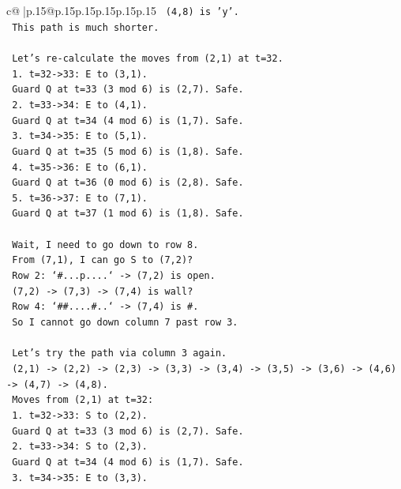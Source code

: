 \documentclass{article}
\begin{document}
{\begin{supertabular}{c@{$\;$}|p{.15\linewidth}@{}p{.15\linewidth}p{.15\linewidth}p{.15\linewidth}p{.15\linewidth}p{.15\linewidth}}
{{{\texttt{   (4,8) is 'y'.} \\
\texttt{   This path is much shorter.} \\
\\ 
\texttt{   Let's re{-}calculate the moves from (2,1) at t=32.} \\
\texttt{   1. t=32{-}>33: E to (3,1).} \\
\texttt{      Guard Q at t=33 (3 mod 6) is (2,7). Safe.} \\
\texttt{   2. t=33{-}>34: E to (4,1).} \\
\texttt{      Guard Q at t=34 (4 mod 6) is (1,7). Safe.} \\
\texttt{   3. t=34{-}>35: E to (5,1).} \\
\texttt{      Guard Q at t=35 (5 mod 6) is (1,8). Safe.} \\
\texttt{   4. t=35{-}>36: E to (6,1).} \\
\texttt{      Guard Q at t=36 (0 mod 6) is (2,8). Safe.} \\
\texttt{   5. t=36{-}>37: E to (7,1).} \\
\texttt{      Guard Q at t=37 (1 mod 6) is (1,8). Safe.} \\
\\ 
\texttt{   Wait, I need to go down to row 8.} \\
\texttt{   From (7,1), I can go S to (7,2)?} \\
\texttt{   Row 2: `\#...p....` {-}> (7,2) is open.} \\
\texttt{   (7,2) {-}> (7,3) {-}> (7,4) is wall?} \\
\texttt{   Row 4: `\#\#....\#..` {-}> (7,4) is \#.} \\
\texttt{   So I cannot go down column 7 past row 3.} \\
\\ 
\texttt{   Let's try the path via column 3 again.} \\
\texttt{   (2,1) {-}> (2,2) {-}> (2,3) {-}> (3,3) {-}> (3,4) {-}> (3,5) {-}> (3,6) {-}> (4,6) {-}> (4,7) {-}> (4,8).} \\
\texttt{   Moves from (2,1) at t=32:} \\
\texttt{   1. t=32{-}>33: S to (2,2).} \\
\texttt{      Guard Q at t=33 (3 mod 6) is (2,7). Safe.} \\
\texttt{   2. t=33{-}>34: S to (2,3).} \\
\texttt{      Guard Q at t=34 (4 mod 6) is (1,7). Safe.} \\
\texttt{   3. t=34{-}>35: E to (3,3).} \\
}}}
\end{supertabular}}
\end{document}
